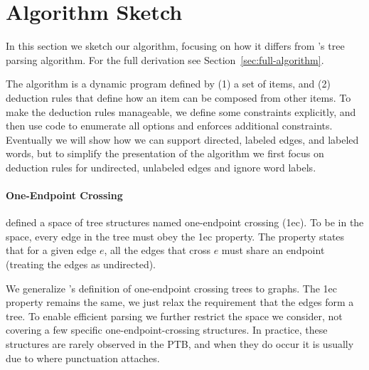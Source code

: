 \section{Algorithm Sketch}



In this section we sketch our algorithm, focusing on how it differs from \textcite{ec}'s tree parsing algorithm.
For the full derivation see Section~\ref{sec:full-algorithm}.

The algorithm is a dynamic program defined by (1) a set of items, and (2) deduction rules that define how an item can be composed from other items.
To make the deduction rules manageable, we define some constraints explicitly, and then use code to enumerate all options and enforces additional constraints.
Eventually we will show how we can support directed, labeled edges, and labeled words, but to simplify the presentation of the algorithm we first focus on deduction rules for undirected, unlabeled edges and ignore word labels.

\paragraph{One-Endpoint Crossing}
\textcite{ec} defined a space of tree structures named one-endpoint crossing (1ec).
To be in the space, every edge in the tree must obey the 1ec property.
The property states that for a given edge $e$, all the edges that cross $e$ must share an endpoint (treating the edges as undirected).

We generalize \textcite{ec}'s definition of one-endpoint crossing trees to graphs.
The 1ec property remains the same, we just relax the requirement that the edges form a tree.
To enable efficient parsing we further restrict the space we consider, not covering a few specific one-endpoint-crossing structures.
In practice, these structures are rarely observed in the PTB, and when they do occur it is usually due to where punctuation attaches.

